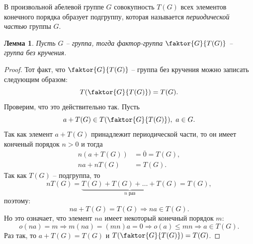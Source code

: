 \documentclass{article}
\newtheorem{lemma}{Лемма}[section]
\begin{document}
В произвольной абелевой группе $G$ совокупность $T(G)$ всех элементов конечного порядка образует подгруппу, которая называется \textit{периодической частью} группы $G$.

\begin{lemma}
    Пусть $G$ -- группа, тогда фактор-группа $\faktor{G}{T(G)}$ -- группа без кручения.
\end{lemma}
\begin{proof}
    Тот факт, что $\faktor{G}{T(G)}$ -- группа без кручения можно записать следующим образом: $$ T(\faktor{G}{T(G)}) = T(G). $$
    Проверим, что это действительно так. Пусть $$ a + T(G) \in T(\faktor{G}{T(G)}), \ a \in G. $$
    Так как элемент $a + T(G)$ принадлежит периодической части, то он имеет конченый порядок $n > 0$ и тогда
    \begin{align*}
        n(a + T(G)) &= \overline{0} = T(G), \\
        na + n T(G) & = T(G).
    \end{align*}
    Так как $T(G)$ -- подгруппа, то 
    \[
        n T(G) = \underbrace{T(G) + T(G) + \ldots + T(G)}_{n \text{ раз}} = T(G),
    \] поэтому:
    \[
        na + T(G) = T(G) \Rightarrow na \in T(G).
    \]
    Но это означает, что элемент $na$ имеет некоторый конечный порядок $m$:
    \[
        o(na) = m \Rightarrow m(na) = (mn)a = 0 \Rightarrow o(a) \leqslant mn \Rightarrow a \in T(G).
    \]
    Раз так, то $a + T(G) = T(G)$ и $T(\faktor{G}{T(G)}) = T(G)$.
\end{proof}
\end{document}

